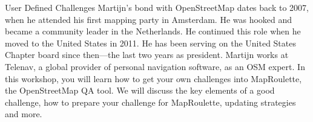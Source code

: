 %
{User Defined Challenges}%
{Martijn's bond with OpenStreetMap dates back to 2007, when he attended his first mapping party in Amsterdam. He was hooked and became a community leader in the Netherlands. He continued this role when he moved to the United States in 2011. He has been serving on the United States Chapter board since then---the last two years as president. Martijn works at Telenav, a global provider of personal navigation software, as an OSM expert. }%
{In this workshop, you will learn how to get your own challenges into MapRoulette, the OpenStreetMap QA tool. We will discuss the key elements of a good challenge, how to prepare your challenge for MapRoulette, updating strategies and more.
}%
